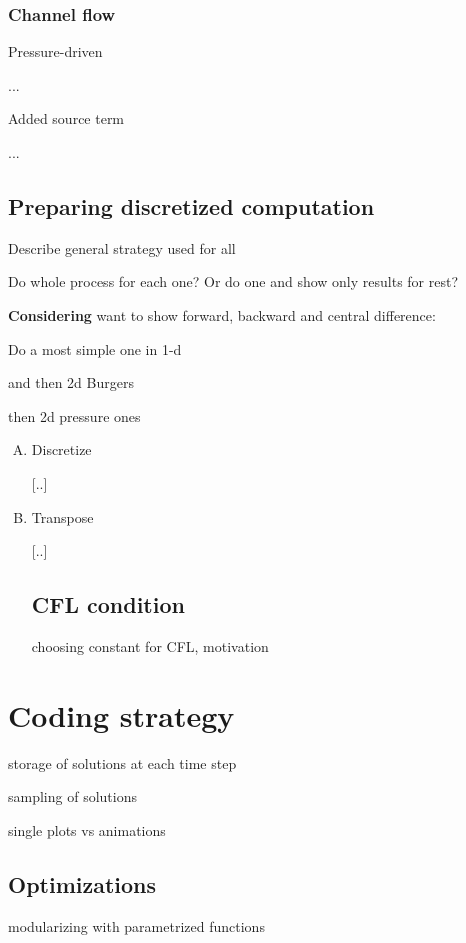 \documentclass[11pt]{article}
\begin{document}
{\subsubsection{Channel flow}
Pressure-driven

...

Added source term

...


\subsection{Preparing discretized computation}

Describe general strategy used for all

Do whole process for each one? Or do one and show only results for rest?

\textbf{Considering} want to show forward, backward and central difference:

Do a most simple one in 1-d

and then 2d Burgers

then 2d pressure ones

\begin{enumerate}[(A)]
\item Discretize

[..]

\item Transpose

[..]

\subsection{CFL condition}
choosing constant for CFL, motivation

\end{enumerate}

\section{Coding strategy}

storage of solutions at each time step

sampling of solutions

single plots vs animations

\subsection{Optimizations}

modularizing with parametrized functions

}
\end{document}
